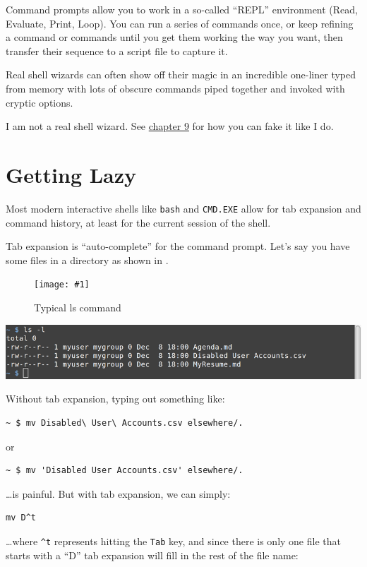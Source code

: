 \documentclass[10pt,]{book}
\numberwithin{figure}{chapter}
\DeclareRobustCommand{\fimg}[3]{
\ifxetex
\begin{figure}[H]
\texttt{[image: \#1]}
\caption{#2}
\label{fig:#3}
\end{figure}
\fi}
\DeclareRobustCommand{\fref}[1]{\ifxetex{(Figure \ref{fig:#1})}\fi}
\begin{document}
Command prompts allow you to work in a so-called ``REPL'' environment
(Read, Evaluate, Print, Loop). You can run a series of commands once, or
keep refining a command or commands until you get them working the way
you want, then transfer their sequence to a script file to capture it.

Real shell wizards can often show off their magic in an incredible
one-liner typed from memory with lots of obscure commands piped together
and invoked with cryptic options.

I am not a real shell wizard. See
\hyperref[how-do-you-know-what-you-dont-know-man]{chapter 9} for how you
can fake it like I do.

\section{Getting Lazy}\label{getting-lazy}

Most modern interactive shells like \texttt{bash} and \texttt{CMD.EXE}
allow for tab expansion and command history, at least for the current
session of the shell.

Tab expansion is ``auto-complete'' for the command prompt. Let's say you
have some files in a directory as shown in \fref{ls-for-tab-completion}.

\ifxetex\fimg{./images/ls-for-tab-completion.png}{Typical ls command}{ls-for-tab-completion}
\else
\includegraphics{./images/ls-for-tab-completion.png} \fi

Without tab expansion, typing out something like:

\begin{verbatim}
~ $ mv Disabled\ User\ Accounts.csv elsewhere/.
\end{verbatim}

or

\begin{verbatim}
~ $ mv 'Disabled User Accounts.csv' elsewhere/.
\end{verbatim}

\ldots{}is painful. But with tab expansion, we can simply:

\begin{verbatim}
mv D^t
\end{verbatim}

\ldots{}where \texttt{\^{}t} represents hitting the \texttt{Tab} key,
and since there is only one file that starts with a ``D'' tab expansion
will fill in the rest of the file name:
\end{document}
